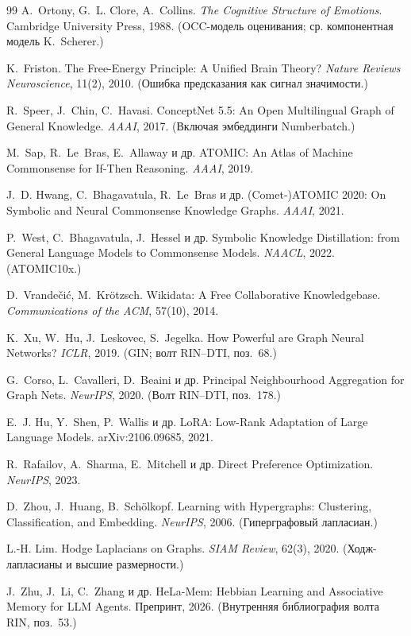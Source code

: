 \begin{thebibliography}{99}
 A.~Ortony, G.~L. Clore, A.~Collins.
\emph{The Cognitive Structure of Emotions}. Cambridge University Press, 1988.
(OCC-модель оценивания; ср. компонентная модель K.~Scherer.)

 K.~Friston.
The Free-Energy Principle: A Unified Brain Theory?
\emph{Nature Reviews Neuroscience}, 11(2), 2010. (Ошибка предсказания как сигнал значимости.)

 R.~Speer, J.~Chin, C.~Havasi.
ConceptNet 5.5: An Open Multilingual Graph of General Knowledge.
\emph{AAAI}, 2017. (Включая эмбеддинги Numberbatch.)

 M.~Sap, R.~Le~Bras, E.~Allaway и др.
ATOMIC: An Atlas of Machine Commonsense for If-Then Reasoning. \emph{AAAI}, 2019.

 J.~D. Hwang, C.~Bhagavatula, R.~Le~Bras и др.
(Comet-)ATOMIC 2020: On Symbolic and Neural Commonsense Knowledge Graphs.
\emph{AAAI}, 2021.

 P.~West, C.~Bhagavatula, J.~Hessel и др.
Symbolic Knowledge Distillation: from General Language Models to Commonsense Models.
\emph{NAACL}, 2022. (ATOMIC10x.)

 D.~Vrande\v{c}i\'c, M.~Kr\"otzsch.
Wikidata: A Free Collaborative Knowledgebase.
\emph{Communications of the ACM}, 57(10), 2014.

 K.~Xu, W.~Hu, J.~Leskovec, S.~Jegelka.
How Powerful are Graph Neural Networks? \emph{ICLR}, 2019. (GIN; волт RIN–DTI,
поз.~68.)

 G.~Corso, L.~Cavalleri, D.~Beaini и др.
Principal Neighbourhood Aggregation for Graph Nets. \emph{NeurIPS}, 2020.
(Волт RIN–DTI, поз.~178.)

 E.~J. Hu, Y.~Shen, P.~Wallis и др.
LoRA: Low-Rank Adaptation of Large Language Models. arXiv:2106.09685, 2021.

 R.~Rafailov, A.~Sharma, E.~Mitchell и др.
Direct Preference Optimization. \emph{NeurIPS}, 2023.

 D.~Zhou, J.~Huang, B.~Sch\"olkopf.
Learning with Hypergraphs: Clustering, Classification, and Embedding.
\emph{NeurIPS}, 2006. (Гиперграфовый лапласиан.)

 L.-H. Lim. Hodge Laplacians on Graphs.
\emph{SIAM Review}, 62(3), 2020. (Ходж-лапласианы и высшие размерности.)

 J.~Zhu, J.~Li, C.~Zhang и др.
HeLa-Mem: Hebbian Learning and Associative Memory for LLM Agents. Препринт, 2026.
(Внутренняя библиография волта RIN, поз.~53.)


\end{thebibliography}
